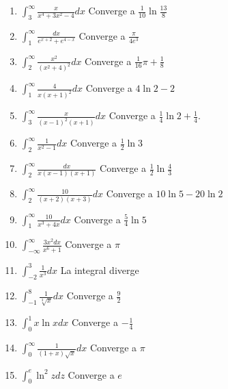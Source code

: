 \begin{enumerate}
\item {$\displaystyle\int_{3}^{\infty }\frac{x}{x^{4}+3x^{2}-4}dx$} {Converge a $\frac{1}{10}\ln \frac{13}{8}$}

\item {$\displaystyle\int_{1}^{\infty }\frac{dx}{e^{x+2}+e^{4-x}}$} {Converge a $\frac{\pi }{4e^{3}}$}

\item {$\displaystyle\int_{2}^{\infty }\frac{x^{2}}{\left( x^{2}+4\right) ^{2}}dx$} {Converge a $\frac{1}{16}\pi +\frac{1}{8}$}

\item {$\displaystyle\int_{1}^{\infty }\frac{4}{x\left( x+1\right) ^{2}}dx$} {Converge a $4\ln 2 -2$}

\item {$\displaystyle\int_{3}^{\infty }\frac{x}{\left( x-1\right) ^{2}\left( x+1\right) }dx$} {Converge a $\frac{1}{4}\ln 2+\frac{1}{4}$.}

\item {$\displaystyle\int_{2}^{\infty }\frac{1}{x^{2}-1}dx$} {Converge a $\frac{1}{2}\ln 3$}

\item {$\displaystyle\int_{2}^{\infty }\frac{dx}{x\left( x-1\right) \left( x+1\right) }$} {Converge a $\frac{1}{2}\ln \frac{4}{3}$}

\item {$\displaystyle\int_{2}^{\infty }\frac{10}{\left( x+2\right) \left( x+3\right)}dx $} {Converge a $10\ln 5-20\ln 2 $}

\item {$\displaystyle\int_{1}^{\infty }\frac{10}{x^{3}+4x}dx$} {Converge a $\frac{5}{4}\ln 5 $}

\item {$\displaystyle\int_{-\infty }^{\infty }\frac{3x^{2}dx}{x^{6}+1}$} {Converge a $\pi$}

\item {$\displaystyle\int_{-2}^{3}\frac{1}{x^{3}}dx$} {La integral diverge}

\item {$\displaystyle\int_{-1}^{8}\frac{1}{\sqrt[3]{x}}dx$} {Converge a $\frac{9}{2}$}

\item {$\displaystyle\int_{0}^{1}x\ln xdx$} {Converge a $-\frac{1}{4}$}

\item {$\displaystyle\int_{0}^{\infty }\frac{1}{\left( 1+x\right) \sqrt{x}}dx$} {Converge a $\pi$}

\item {$\displaystyle\int_{0}^{e}\ln ^{2}zdz$} {Converge a $e$}
\end{enumerate}



